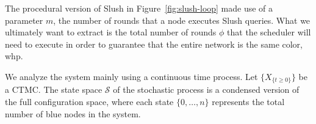 \documentclass[letterpaper,twocolumn,10pt]{article}
\theoremstyle{definition}
\begin{document}
\begin{appendices}

The procedural version of Slush in Figure~\ref{fig:slush-loop} made use of a parameter $m$, the number of rounds that a node executes Slush queries. 
What we ultimately want to extract is the total number of rounds $\phi$ that the scheduler will need to execute in order to guarantee that the entire network is the same color, whp.

We analyze the system mainly using a continuous time process. Let $\{X_{\{t \geq 0\}}\}$ be a CTMC.
The state space $\mathcal{S}$ of the stochastic process is a condensed version of the full configuration space, where each state $\{0, \dots, n\}$ represents the total number of blue nodes in the system. 


\end{appendices}
\end{document}

